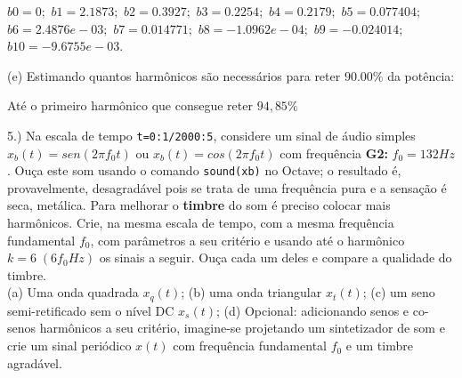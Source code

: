 \documentclass{article}
\begin{document}
\vspace{\baselineskip}

$b0 = 0;$
$b1 = 2.1873;$
$b2 = 0.3927;$
$b3 = 0.2254;$
$b4 = 0.2179;$
$b5 = 0.077404;$
$b6 = 2.4876e-03;$
$b7 = 0.014771;$
$b8 = -1.0962e-04;$
$b9 = -0.024014;$
$b10 = -9.6755e-03.$

\vspace{\baselineskip}

(e) Estimando quantos harmônicos são necessários para reter $90.00\%$ da potência:

\vspace{\baselineskip}

Até o primeiro harmônico que consegue reter $94,85\% $

\vspace{\baselineskip}

5.) Na escala de tempo {\tt t=0:1/2000:5}, considere um sinal de áudio simples $x_{b}(t) = sen(2 \pi f_{0}t)$ ou $x_{b}(t) = cos(2 \pi f_{0}t)$ com frequência \textbf{G2:} $f_{0} = 132Hz$. Ouça este som usando o comando {\tt sound(xb)} no Octave; o resultado é, provavelmente, desagradável pois se trata de uma frequência pura e a sensação é seca, metálica. Para melhorar o \textbf{timbre} do som é preciso colocar mais harmônicos. Crie, na mesma escala de tempo, com a mesma frequência fundamental $f_{0}$, com parâmetros a seu critério e usando até o harmônico $k = 6\;(6f_{0}Hz)$ os sinais a seguir. Ouça cada um deles e compare a qualidade do timbre.\\
(a) Uma onda quadrada $x_{q}(t)$;
(b) uma onda triangular $x_{t}(t)$;
(c) um seno semi-retificado sem o nível DC $x_{s}(t)$;
(d) Opcional: adicionando senos e co-senos harmônicos a seu critério, imagine-se projetando um sintetizador de som e crie um sinal periódico $x(t)$ com frequência fundamental $f_{0}$ e um timbre agradável.
\end{document}
